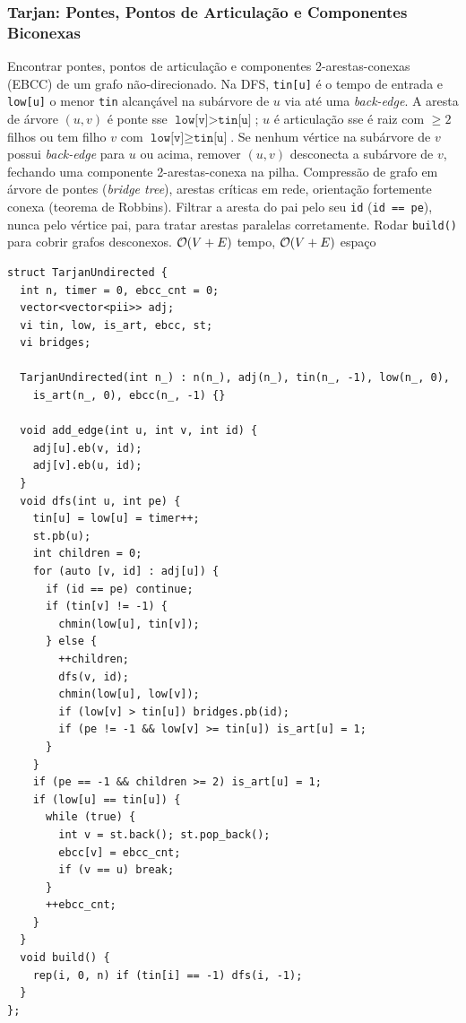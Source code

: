 \subsubsection{Tarjan: Pontes, Pontos de Articulação e Componentes Biconexas}
\algobox
  {Encontrar pontes, pontos de articulação e componentes 2-arestas-conexas (EBCC) de um grafo não-direcionado.}
  {Na DFS, \texttt{tin[u]} é o tempo de entrada e \texttt{low[u]} o menor \texttt{tin} alcançável na subárvore de $u$ via até uma \emph{back-edge}. A aresta de árvore $(u, v)$ é ponte sse $\texttt{low[v]} > \texttt{tin[u]}$; $u$ é articulação sse é raiz com $\ge 2$ filhos ou tem filho $v$ com $\texttt{low[v]} \ge \texttt{tin[u]}$.}
  {Se nenhum vértice na subárvore de $v$ possui \emph{back-edge} para $u$ ou acima, remover $(u, v)$ desconecta a subárvore de $v$, fechando uma componente 2-arestas-conexa na pilha.}
  {Compressão de grafo em árvore de pontes (\emph{bridge tree}), arestas críticas em rede, orientação fortemente conexa (teorema de Robbins).}
  {Filtrar a aresta do pai pelo seu \texttt{id} (\texttt{id == pe}), nunca pelo vértice pai, para tratar arestas paralelas corretamente. Rodar \texttt{build()} para cobrir grafos desconexos.}
  {$\mathcal{O}(V + E)$ tempo, $\mathcal{O}(V + E)$ espaço}

\begin{lstlisting}
struct TarjanUndirected {
  int n, timer = 0, ebcc_cnt = 0;
  vector<vector<pii>> adj;
  vi tin, low, is_art, ebcc, st;
  vi bridges;

  TarjanUndirected(int n_) : n(n_), adj(n_), tin(n_, -1), low(n_, 0),
    is_art(n_, 0), ebcc(n_, -1) {}

  void add_edge(int u, int v, int id) {
    adj[u].eb(v, id);
    adj[v].eb(u, id);
  }
  void dfs(int u, int pe) {
    tin[u] = low[u] = timer++;
    st.pb(u);
    int children = 0;
    for (auto [v, id] : adj[u]) {
      if (id == pe) continue;
      if (tin[v] != -1) {
        chmin(low[u], tin[v]);
      } else {
        ++children;
        dfs(v, id);
        chmin(low[u], low[v]);
        if (low[v] > tin[u]) bridges.pb(id);
        if (pe != -1 && low[v] >= tin[u]) is_art[u] = 1;
      }
    }
    if (pe == -1 && children >= 2) is_art[u] = 1;
    if (low[u] == tin[u]) {
      while (true) {
        int v = st.back(); st.pop_back();
        ebcc[v] = ebcc_cnt;
        if (v == u) break;
      }
      ++ebcc_cnt;
    }
  }
  void build() {
    rep(i, 0, n) if (tin[i] == -1) dfs(i, -1);
  }
};
\end{lstlisting}

